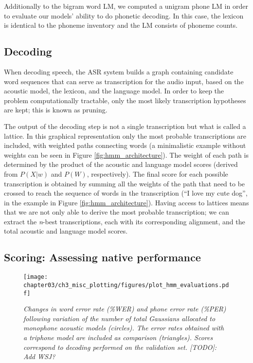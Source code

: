 Additionally to the bigram word LM, we computed a unigram phone LM in order to evaluate our models' ability to do phonetic decoding. In this case, the lexicon is identical to the phoneme inventory and the LM consists of phoneme counts.  

\subsection{Decoding}
When decoding speech, the ASR system builds a graph containing candidate word sequences that can serve as transcription for the audio input, based on the acoustic model, the lexicon, and the language model. In order to keep the problem computationally tractable, only the most likely transcription hypotheses are kept; this is known as pruning.

The output of the decoding step is not a single transcription but what is called a lattice. In this graphical representation only the most probable transcriptions are included, with weighted paths connecting words (a minimalistic example without weights can be seen in Figure \ref{fig:hmm_architecture}). The weight of each path is determined by the product of the acoustic and language model scores (derived from $P(X|w)$ and $P(W)$, respectively). The final score for each possible transcription is obtained by summing all the weights of the path that need to be crossed to reach the sequence of words in the transcription (``I love my cute dog'', in the example in Figure \ref{fig:hmm_architecture}). Having access to lattices means that we are not only able to derive the most probable transcription; we can extract the \textit{n}-best transcriptions, each with its corresponding alignment, and the total acoustic and language model scores.   

\subsection{Scoring: Assessing native performance}

\begin{figure}[htb]
\centering
\texttt{[image: chapter03/ch3\_misc\_plotting/figures/plot\_hmm\_evaluations.pdf]}
\caption{\textit{Changes in word error rate (\%WER) and phone error rate (\%PER) following variation of the number of total Gaussians allocated to monophone acoustic models (circles). The error rates obtained with a triphone model are included as comparison (triangles). Scores correspond to decoding performed on the validation set. {\color{red}[TODO]: Add WSJ?}}}
\label{fig:hmm_gaussians}
\end{figure}


